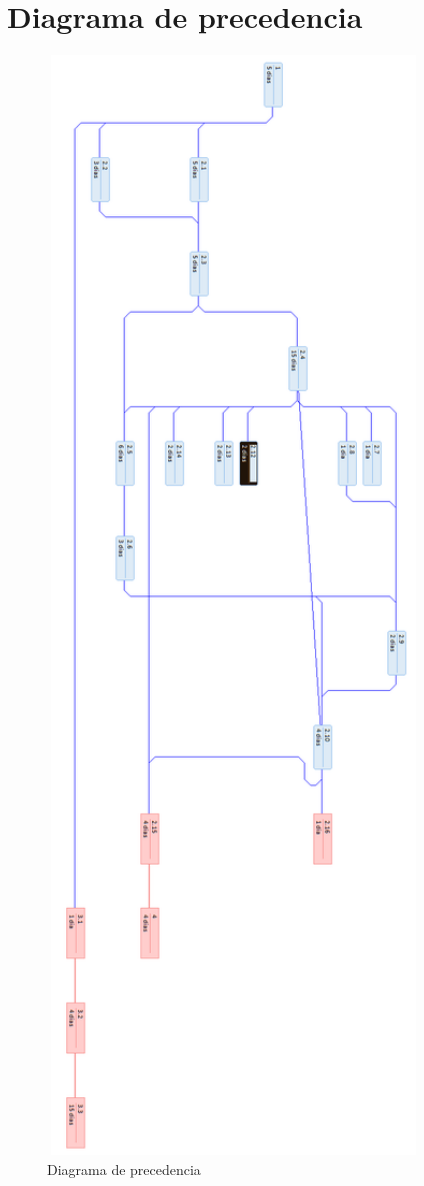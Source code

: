 \documentclass{DeustoFDP}
\begin{document}
\section{Diagrama de precedencia}
\begin{figure}[H]
    \centering
    \includegraphics[width=280pt]{fig/precedencia}
    \caption{Diagrama de precedencia}\label{fig:precedencia}
\end{figure}
\end{document}
